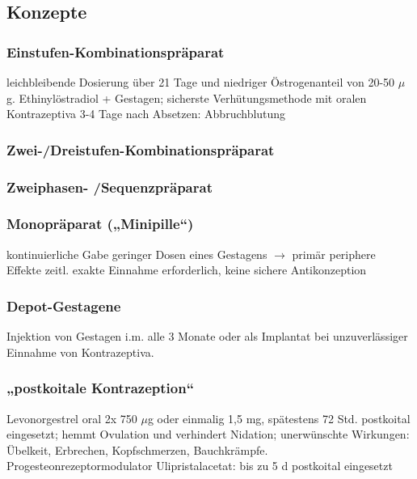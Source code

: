 \documentclass[10pt,a4paper]{report}
\begin{document}
\subsection{Konzepte} %
\label{sub:konzepte}
\subsubsection{Einstufen-Kombinationspräparat} %
\label{par:einstufen_kombinationspr_parat}
leichbleibende Dosierung über 21 Tage und niedriger Östrogenanteil von 20-50 $\mu$g. Ethinylöstradiol + Gestagen; sicherste Verhütungsmethode mit oralen Kontrazeptiva 3-4 Tage nach Absetzen: Abbruchblutung
\subsubsection{Zwei-/Dreistufen-Kombinationspräparat} %
\label{par:zwei_dreistufen_kombinationspr_parat}
\subsubsection{Zweiphasen- /Sequenzpräparat} %
\label{par:zweiphasen_sequenzpr_parat}
\subsubsection{Monopräparat („Minipille“)} %
\label{par:monopr_parat_minipille_}
kontinuierliche Gabe geringer Dosen eines Gestagens $\rightarrow$ primär periphere Effekte 	zeitl. exakte Einnahme erforderlich, keine sichere Antikonzeption
\subsubsection{Depot-Gestagene} %
\label{par:depot_gestagene}
Injektion von Gestagen i.m. alle 3 Monate oder als Implantat bei unzuverlässiger Einnahme von Kontrazeptiva.
\subsubsection{„postkoitale Kontrazeption“} %
\label{par:_postkoitale_kontrazeption_}
Levonorgestrel oral 2x 750 $\mu$g oder einmalig 1,5 mg, spätestens 72 Std. postkoital eingesetzt; hemmt Ovulation und verhindert Nidation; unerwünschte Wirkungen: Übelkeit, Erbrechen, Kopfschmerzen, Bauchkrämpfe. Progesteonrezeptormodulator Ulipristalacetat: bis zu 5 d postkoital eingesetzt
\end{document}
